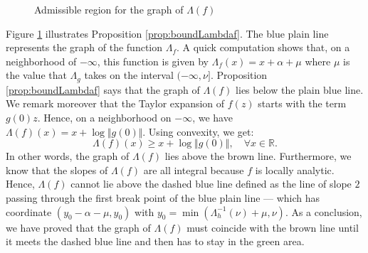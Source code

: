 \documentclass{sig-alternate}
\newcommand{\R}{\mathbb R}
\begin{document}
\begin{figure}
\null \hfill
{}
\hfill \null

\caption{Admissible region for the graph of $\Lambda(f)$}
\label{fig:area}
\end{figure}

Figure \ref{fig:area} illustrates Proposition \ref{prop:boundLambdaf}. 
The blue plain line represents the graph of the function $\Lambda_f$. A 
quick computation shows that, on a neighborhood of ${-}\infty$, this 
function is given by $\Lambda_f(x) = x + \alpha + \mu$
where $\mu$ is the value that $\Lambda_g$ takes on the interval 
$({-}\infty, \nu]$. Proposition \ref{prop:boundLambdaf} says that the
graph of $\Lambda(f)$ lies below the plain blue line. We remark
moreover that the Taylor expansion of $f(z)$ starts with the term
$g(0) z$. Hence, on a neighborhood on ${-}\infty$, we have 
$\Lambda(f)(x) = x + \log \Vert g(0) \Vert$. Using convexity, we 
get:
$$\Lambda(f)(x) \geq x + \log \Vert g(0) \Vert, 
  \quad \forall x \in \R.$$
In other words, the graph of $\Lambda(f)$ lies above the brown line.
Furthermore, we know that the slopes of $\Lambda(f)$ are all integral
because $f$ is locally analytic. Hence, $\Lambda(f)$ cannot lie above
the dashed blue line defined as the line of slope $2$ passing through
the first break point of the blue plain line --- which has coordinate 
$(y_0 - \alpha - \mu, y_0)$ with $y_0 = \min(\Lambda_h^{-1}(\nu) + \mu, 
\nu)$. As a conclusion, we have proved that the graph of $\Lambda(f)$ 
must coincide with the brown line until it meets the dashed blue line 
and then has to stay in the green area.
\end{document}

